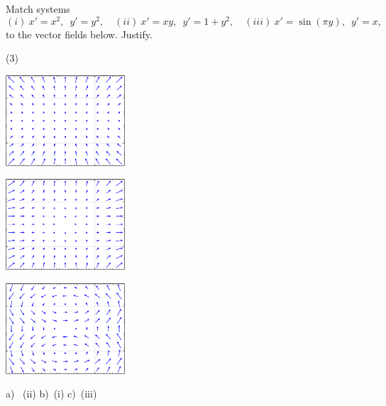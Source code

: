 \begin{samepage}
\begin{exercise}
Match systems
\begin{equation*}
(i)\  x'=x^2, \enspace y'=y^2, \quad (ii)\  x'=xy, \enspace y'=1+y^2, \quad (iii)\  x'=\sin(\pi y), \enspace y'=x,
\end{equation*}
to the vector fields below.  Justify.
\begin{tasks}(3)
\task
\parbox[c]{1.75in}{\includegraphics[width=1.75in]{figures/nlin-exer-xy-1py2}}
\task
\parbox[c]{1.75in}{\includegraphics[width=1.75in]{figures/nlin-exer-x2-y2}}
\task
\parbox[c]{1.75in}{\includegraphics[width=1.75in]{figures/nlin-exer-sinpiy-x}}
\end{tasks}
\end{exercise}
\end{samepage}
\comboSol{%
}
{%
a)~ (ii) \quad b)~(i) \quad c)~(iii)
}

